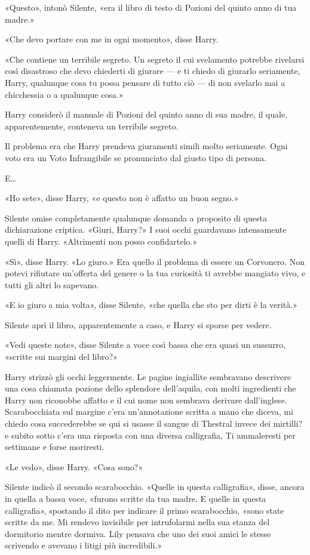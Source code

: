 «Questo», intonò Silente, «era il libro di testo di Pozioni del quinto anno di tua madre.»

«Che devo portare con me in ogni momento», disse Harry.

«Che contiene un terribile segreto. Un segreto il cui svelamento potrebbe rivelarsi così disastroso che devo chiederti di giurare — e ti chiedo di giurarlo seriamente, Harry, qualunque cosa tu possa pensare di tutto ciò — di non svelarlo mai a chicchessia o a qualunque cosa.»

Harry considerò il manuale di Pozioni del quinto anno di sua madre, il quale, apparentemente, conteneva un terribile segreto.

Il problema era che Harry prendeva giuramenti simili molto seriamente. Ogni voto era un Voto Infrangibile se pronunciato dal giusto tipo di persona.

E…

«Ho sete», disse Harry, «e questo non è affatto un buon segno.»

Silente omise completamente qualunque domanda a proposito di questa dichiarazione criptica. «Giuri, Harry?» I suoi occhi guardavano intensamente quelli di Harry. «Altrimenti non posso confidartelo.»

«Sì», disse Harry. «Lo giuro.» Era quello il problema di essere un Corvonero. Non potevi rifiutare un’offerta del genere o la tua curiosità ti avrebbe mangiato vivo, e tutti gli altri lo sapevano.

«E io giuro a mia volta», disse Silente, «che quella che sto per dirti è la verità.»

Silente aprì il libro, apparentemente a caso, e Harry si sporse per vedere.

«Vedi queste note», disse Silente a voce così bassa che era quasi un sussurro, «scritte sui margini del libro?»

Harry strizzò gli occhi leggermente. Le pagine ingiallite sembravano descrivere una cosa chiamata pozione dello splendore dell’aquila, con molti ingredienti che Harry non riconobbe affatto e il cui nome non sembrava derivare dall’inglese. Scarabocchiata sul margine c’era un’annotazione scritta a mano che diceva, mi chiedo cosa succederebbe se qui si usasse il sangue di Thestral invece dei mirtilli? e subito sotto c’era una risposta con una diversa calligrafia, Ti ammaleresti per settimane e forse moriresti.

«Le vedo», disse Harry. «Cosa sono?»

Silente indicò il secondo scarabocchio. «Quelle in questa calligrafia», disse, ancora in quella a bassa voce, «furono scritte da tua madre. E quelle in questa calligrafia», spostando il dito per indicare il primo scarabocchio, «sono state scritte da me. Mi rendevo invisibile per intrufolarmi nella sua stanza del dormitorio mentre dormiva. Lily pensava che uno dei suoi amici le stesse scrivendo e avevano i litigi più incredibili.»

